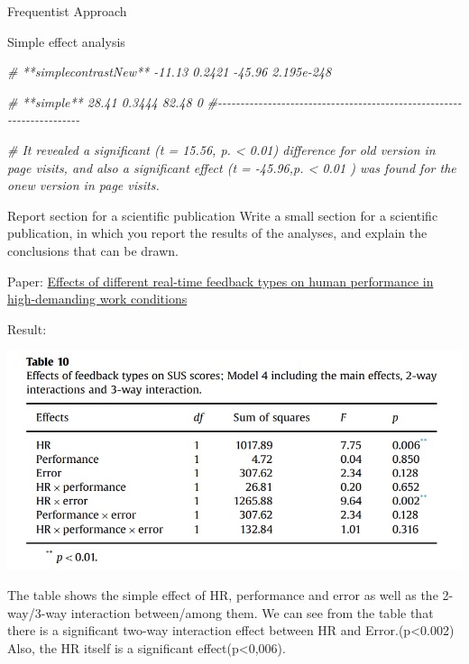\documentclass[
  ignorenonframetext,
]{beamer}
\newenvironment{Shaded}{\begin{snugshade}}{\end{snugshade}}
\newcommand{\CommentTok}[1]{\textcolor[rgb]{0.56,0.35,0.01}{\textit{#1}}}
\begin{document}
\begin{frame}[fragile]{Frequentist Approach}
\begin{block}{Simple effect analysis}
\begin{Shaded}
\begin{Highlighting}[]
\CommentTok{\# **simplecontrastNew**    {-}11.13      0.2421     {-}45.96    2.195e{-}248 }

\CommentTok{\#      **simple**          28.41       0.3444      82.48        0      }
\CommentTok{\#{-}{-}{-}{-}{-}{-}{-}{-}{-}{-}{-}{-}{-}{-}{-}{-}{-}{-}{-}{-}{-}{-}{-}{-}{-}{-}{-}{-}{-}{-}{-}{-}{-}{-}{-}{-}{-}{-}{-}{-}{-}{-}{-}{-}{-}{-}{-}{-}{-}{-}{-}{-}{-}{-}{-}{-}{-}{-}{-}{-}{-}{-}{-}{-}{-}{-}{-}{-}{-}{-}}

\CommentTok{\# It revealed a significant (t = 15.56, p. \textless{} 0.01) difference for old version in page visits, and also a significant effect (t = {-}45.96,p. \textless{} 0.01 ) was found for the onew version in page visits.}
\end{Highlighting}
\end{Shaded}
\end{block}

\begin{block}{Report section for a scientific publication}
\protect\hypertarget{report-section-for-a-scientific-publication-1}{}
Write a small section for a scientific publication, in which you report
the results of the analyses, and explain the conclusions that can be
drawn.

Paper:
\href{https://www.sciencedirect.com/science/article/pii/S1071581916000392}{Effects
of different real-time feedback types on human performance in
high-demanding work conditions}

Result:

\includegraphics{table.jpg}

The table shows the simple effect of HR, performance and error as well
as the 2-way/3-way interaction between/among them. We can see from the
table that there is a significant two-way interaction effect between HR
and Error.(p\textless0.002) Also, the HR itself is a significant
effect(p\textless0,006).
\end{block}
\end{frame}
\end{document}
